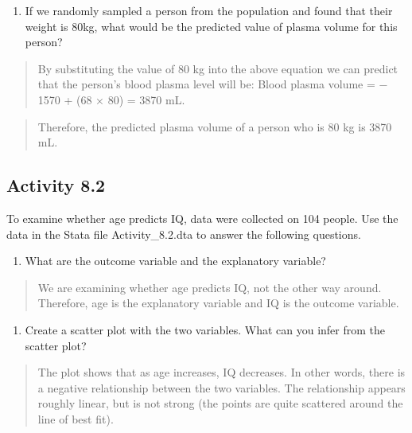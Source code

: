\documentclass[
]{memoir}
\providecommand{\tightlist}{%
  \setlength{\itemsep}{0pt}\setlength{\parskip}{0pt}}
\begin{document}
\begin{enumerate}
\def\labelenumi{\alph{enumi})}
\setcounter{enumi}{3}
\tightlist
\item
  If we randomly sampled a person from the population and found that their weight is 80kg, what would be the predicted value of plasma volume for this person?
\end{enumerate}

\begin{quote}
By substituting the value of 80 kg into the above equation we can predict that the person's blood plasma level will be: Blood plasma volume = − 1570 + (68 × 80) = 3870 mL.
\end{quote}

\begin{quote}
Therefore, the predicted plasma volume of a person who is 80 kg is 3870 mL.
\end{quote}

\hypertarget{activity-8.2}{%
\subsection*{Activity 8.2}\label{activity-8.2}}

To examine whether age predicts IQ, data were collected on 104 people. Use the data in the Stata file Activity\_8.2.dta to answer the following questions.

\begin{enumerate}
\def\labelenumi{\alph{enumi})}
\tightlist
\item
  What are the outcome variable and the explanatory variable?
\end{enumerate}

\begin{quote}
We are examining whether age predicts IQ, not the other way around. Therefore, age is the explanatory variable and IQ is the outcome variable.
\end{quote}

\begin{enumerate}
\def\labelenumi{\alph{enumi})}
\setcounter{enumi}{1}
\tightlist
\item
  Create a scatter plot with the two variables. What can you infer from the scatter plot?
\end{enumerate}

\begin{quote}
The plot shows that as age increases, IQ decreases. In other words, there is a negative relationship between the two variables. The relationship appears roughly linear, but is not strong (the points are quite scattered around the line of best fit).
\end{quote}
\end{document}
